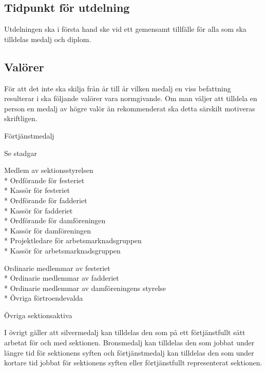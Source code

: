 \documentclass{datateknologsektionen-document}
\begin{document}
\subsection{Tidpunkt för utdelning}
Utdelningen ska i första hand ske vid ett gemensamt tillfälle för alla som ska tilldelas medalj och
diplom.
\subsection{Valörer}
För att det inte ska skilja från år till år vilken medalj en viss befattning resulterar i ska följande
valörer vara normgivande. Om man väljer att tilldela en person en medalj av högre valör än
rekommenderat ska detta särskilt motiveras skriftligen.
\begin{labeling}{Förtjänstmedalj}
  \item [Guld] Se stadgar
  \item [Silver] Medlem av sektionsstyrelsen\\*
  Ordförande för festeriet\\*
  Kassör för festeriet\\*
  Ordförande för fadderiet\\*
  Kassör för fadderiet\\*
  Ordförande för damföreningen\\*
  Kassör för damföreningen\\*
  Projektledare för arbetsmarknadsgruppen\\*
  Kassör för arbetsmarknadsgruppen
  \item [Brons] Ordinarie medlemmar av festeriet\\*
  Ordinarie medlemmar av fadderiet\\*
  Ordinarie medlemmar av damföreningens styrelse\\*
  Övriga förtroendevalda
  \item [Förtjänstmedalj] Övriga sektionsaktiva
\end{labeling}


I övrigt gäller att silvermedalj kan tilldelas den som på ett förtjänstfullt sätt arbetat för och med
sektionen. Bronsmedalj kan tilldelas den som jobbat under längre tid för sektionens syften och
förtjänstmedalj kan tilldelas den som under kortare tid jobbat för sektionens syften eller
förtjänstfullt representerat sektionen.
\end{document}
